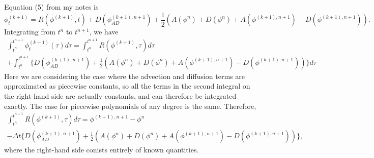 \documentclass[12pt]{article}
\begin{document}
\noindent
Equation (5) from my notes is
\[
\phi^{(k+1)}_t = R(\phi^{(k+1)},t) + D(\phi_{AD}^{(k+1),n+1})
                 + \frac{1}{2}\left(A(\phi^n) + D(\phi^n) + 
                    A(\phi^{(k+1),n+1})-D(\phi^{(k+1),n+1})\right).
\]
Integrating from $t^n$ to $t^{n+1}$, we have
\begin{multline*}
   \int_{t^n}^{t^{n+1}} \phi^{(k+1)}_t(\tau) d\tau = 
      \int_{t^n}^{t^{n+1}} R(\phi^{(k+1)},\tau) d\tau \\
      + \int_{t^n}^{t^{n+1}} \Big\{  D(\phi_{AD}^{(k+1),n+1})
                 + \frac{1}{2}\left(A(\phi^n) + D(\phi^n) + 
                    A(\phi^{(k+1),n+1})-D(\phi^{(k+1),n+1})\right) \Big\} d\tau
\end{multline*}
Here we are considering the case where the advection and diffusion terms are 
approximated as piecewise constants, so all the terms in the second integral 
on the right-hand side are actually constants, and can therefore be integrated 
exactly. The case for piecewise polynomials of any degree is the same.
Therefore,
\begin{multline*}
   \int_{t^n}^{t^{n+1}} R(\phi^{(k+1)},\tau) d\tau = \phi^{(k+1),n+1} - \phi^n \\
    - \Delta t \Big\{  D(\phi_{AD}^{(k+1),n+1}) 
                 + \frac{1}{2}\left(A(\phi^n) + D(\phi^n) + 
                    A(\phi^{(k+1),n+1})-D(\phi^{(k+1),n+1})\right) \Big\},
\end{multline*}
where the right-hand side conists entirely of known quantities.
\end{document}
